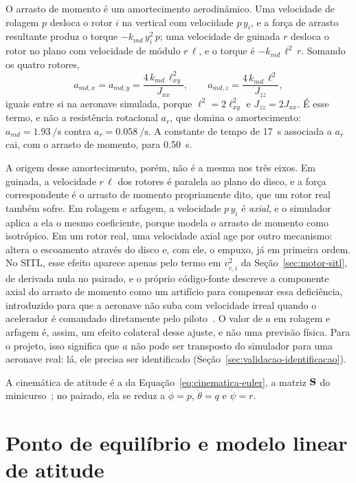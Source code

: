 O arrasto de momento é um amortecimento aerodinâmico. Uma velocidade de
rolagem $p$ desloca o rotor $i$ na vertical com velocidade $p\,y_i$, e a força
de arrasto resultante produz o torque $-k_{md}\,y_i^2\,p$; uma velocidade de
guinada $r$ desloca o rotor no plano com velocidade de módulo $r\,\ell$, e o
torque é $-k_{md}\,\ell^2\,r$. Somando os quatro rotores,
\begin{equation}
a_{md,x} = a_{md,y} = \frac{4\,k_{md}\,\ell_{xy}^2}{J_{xx}}, \qquad
a_{md,z} = \frac{4\,k_{md}\,\ell^2}{J_{zz}},
\label{eq:amortecimento-md}
\end{equation}
iguais entre si na aeronave simulada, porque $\ell^2 = 2\ell_{xy}^2$ e
$J_{zz} = 2J_{xx}$. É esse termo, e não a resistência rotacional $a_r$, que
domina o amortecimento: $a_{md} = \SI{1.93}{\per\second}$ contra
$a_r = \SI{0.058}{\per\second}$. A constante de tempo de \SI{17}{\second}
associada a $a_r$ cai, com o arrasto de momento, para \SI{0.50}{\second}.

A origem desse amortecimento, porém, não é a mesma nos três eixos. Em
guinada, a velocidade $r\,\ell$ dos rotores é paralela ao plano do disco, e a
força correspondente é o arrasto de momento propriamente dito, que um rotor
real também sofre. Em rolagem e arfagem, a velocidade $p\,y_i$ é
\emph{axial}, e o simulador aplica a ela o mesmo coeficiente, porque modela o
arrasto de momento como isotrópico. Em um rotor real, uma velocidade axial age
por outro mecanismo: altera o escoamento através do disco e, com ele, o
empuxo, já em primeira ordem. No SITL, esse efeito aparece apenas pelo termo
em $v_{e,i}^2$ da Seção~\ref{sec:motor-sitl}, de derivada nula no pairado, e o
próprio código-fonte descreve a componente axial do arrasto de momento como
um artifício para compensar essa deficiência, introduzido para que a
aeronave não suba com velocidade irreal quando o acelerador é comandado
diretamente pelo piloto~\cite{ardupilot2026}. O valor de $a$ em rolagem e
arfagem é, assim, um efeito colateral desse ajuste, e não uma previsão
física. Para o projeto, isso significa que $a$ não pode ser transposto do
simulador para uma aeronave real: lá, ele precisa ser identificado
(Seção~\ref{sec:validacao-identificacao}).

A cinemática de atitude é a da Equação~\eqref{eq:cinematica-euler}, a matriz
$\mathbf{S}$ do minicurso~\cite{fischer2025}; no pairado, ela se reduz a
$\dot\phi = p$, $\dot\theta = q$ e $\dot\psi = r$.

\section{Ponto de equilíbrio e modelo linear de atitude}
\label{sec:modelo-linear}


